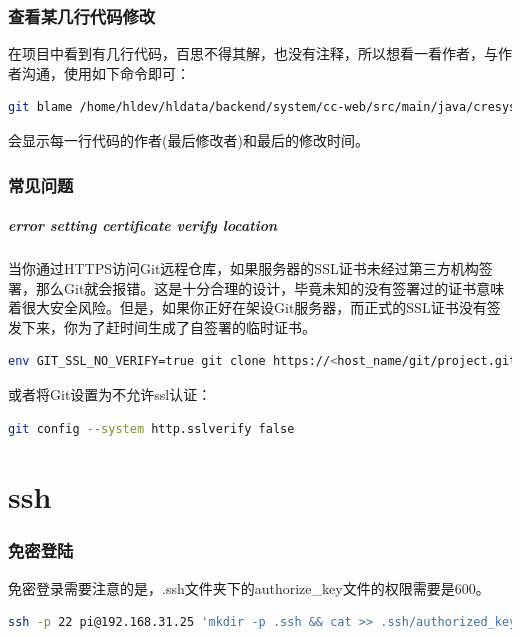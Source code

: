 \documentclass[letter]{book}
\begin{document}
\subsection{查看某几行代码修改}在项目中看到有几行代码，百思不得其解，也没有注释，所以想看一看作者，与作者沟通，使用如下命令即可：

\begin{lstlisting}[language=Bash]
git blame /home/hldev/hldata/backend/system/cc-web/src/main/java/cresystem/web/controllers/pubapi/PubapiOrgController.java
\end{lstlisting}

会显示每一行代码的作者(最后修改者)和最后的修改时间。

\subsection{常见问题}


\paragraph{error setting certificate verify location}

当你通过HTTPS访问Git远程仓库，如果服务器的SSL证书未经过第三方机构签署，那么Git就会报错。这是十分合理的设计，毕竟未知的没有签署过的证书意味着很大安全风险。但是，如果你正好在架设Git服务器，而正式的SSL证书没有签发下来，你为了赶时间生成了自签署的临时证书。

\begin{lstlisting}[language=Bash]
env GIT_SSL_NO_VERIFY=true git clone https://<host_name/git/project.git
\end{lstlisting}

或者将Git设置为不允许ssl认证：


\begin{lstlisting}[language=Bash]
git config --system http.sslverify false
\end{lstlisting}


\chapter{ssh}

\subsection{免密登陆}

免密登录需要注意的是，.ssh文件夹下的authorize\_key文件的权限需要是600。

\begin{lstlisting}[language=Bash]
ssh -p 22 pi@192.168.31.25 'mkdir -p .ssh && cat >> .ssh/authorized_keys' < ~/.ssh/id_rsa.pub
\end{lstlisting}
\end{document}
